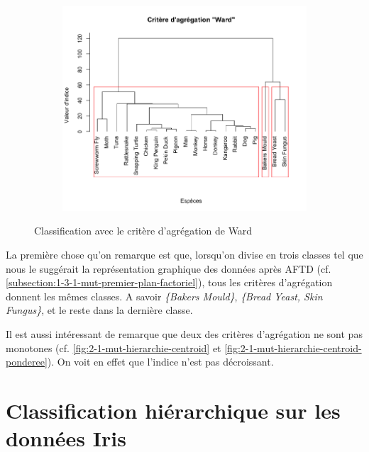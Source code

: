 \documentclass[a4paper,10pt]{report}
\begin{document}
\begin{figure}[H]
	\centering
	\captionsetup{justification=centering, margin=3cm}
	\begin{subfigure}[b]{0.4\linewidth}
		\centering
		\captionsetup{justification=centering}
		\includegraphics[width=1\linewidth]{img/2-1-mut-hierarchie-ward}
		\label{fig:2-1-mut-hierarchie-ward}
	\end{subfigure}%
	\caption{\small Classification avec le critère d'agrégation de Ward}
	\label{fig:2-1-classification-mut-ward}%
\end{figure}



La première chose qu'on remarque est que, lorsqu'on divise en trois classes tel que nous le suggérait la représentation graphique des données après AFTD (cf. \autoref{subsection:1-3-1-mut-premier-plan-factoriel}), tous les critères d'agrégation donnent les mêmes classes. A savoir \textit{\{Bakers Mould\}}, \textit{\{Bread Yeast, Skin Fungus\}}, et le reste dans la dernière classe.

Il est aussi intéressant de remarque que deux des critères d'agrégation ne sont pas monotones (cf. \autoref{fig:2-1-mut-hierarchie-centroid} et \autoref{fig:2-1-mut-hierarchie-centroid-ponderee}). On voit en effet que l'indice n'est pas décroissant.



\section{Classification hiérarchique sur les données Iris}
\end{document}
